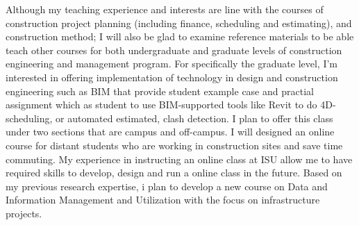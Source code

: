 \documentclass[a4paper,11pt]{article}
\begin{document}
\par
%
Although my teaching experience and interests are line with the courses of construction project planning (including finance, scheduling and estimating), and construction method; I will also be glad to examine reference materials to be able teach other courses for both undergraduate and graduate levels of construction engineering and management program. 
%
For specifically the graduate level, I'm interested in offering implementation of technology in design and construction engineering such as BIM that provide student example case and practial assignment which as student to use BIM-supported tools like Revit to do 4D-scheduling, or automated estimated, clash detection. I plan to offer this class under two sections that are campus and off-campus. I will designed an online course for distant students who are working in construction sites and save time commuting. My experience in instructing an online class at ISU allow me to have required skills to develop, design and run a online class in the future. Based on my previous research expertise, i plan to develop a new course on Data and Information Management and Utilization with the focus on infrastructure projects. 
\end{document}
